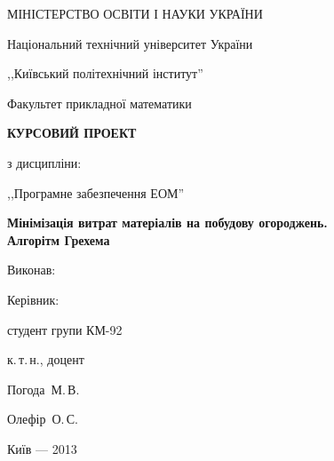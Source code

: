 \documentclass[simple,14pt,draft,utf8,ukrainian]{eskdtext}
\begin{document}
\begin{titlepage}
    \begin{center}
        \MakeUppercase{Міністерство освіти і науки України}

        Національний технічний університет України

        ,,Київський політехнічний інститут''

        \vspace*{0.5cm}

        Факультет прикладної математики

        \vfill

        \textbf{\MakeUppercase{Курсовий проект}}

        з дисципліни:

        ,,Програмне забезпечення ЕОМ''

        \textbf{Мінімізація витрат матеріалів на побудову огороджень.\\
          Алгорітм Грехема}
    \end{center}

    \vfill

    \begin{minipage}{0.15\textwidth}
      Виконав:

      Керівник:
    \end{minipage}
    \begin{minipage}{0.3\textwidth}
      студент групи КМ-92

      к.\,т.\,н., доцент
    \end{minipage}
    \begin{minipage}{0.2\textwidth}
      Погода~М.\,В.

      Олефір~О.\,С.
    \end{minipage}
    \begin{minipage}{0.20\textwidth}
      \underline{\hspace{0.8\textwidth}}

      \underline{\hspace{0.8\textwidth}}
    \end{minipage}

    \vfill

    \vfill

    \begin{center}
        \Large
        Київ --- 2013
    \end{center}
\end{titlepage}
\tableofcontents
\newpage
\end{document}
